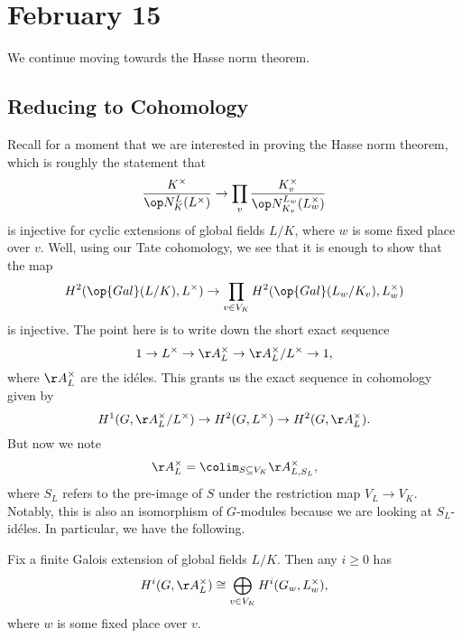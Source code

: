 \documentclass[../notes.tex]{subfiles}
\begin{document}
\section{February 15}
We continue moving towards the Hasse norm theorem.

\subsection{Reducing to Cohomology}
Recall for a moment that we are interested in proving the Hasse norm theorem, which is roughly the statement that
\[\frac{K^\times}{\op N^L_K(L^\times)}\to\prod_{v}\frac{K_v^\times}{\op N_{K_v}^{L_w}(L_w^\times)}\]
is injective for cyclic extensions of global fields $L/K$, where $w$ is some fixed place over $v$. Well, using our Tate cohomology, we see that it is enough to show that the map
\[H^2(\op{Gal}(L/K),L^\times)\to\prod_{v\in V_K}H^2(\op{Gal}(L_w/K_v),L_w^\times)\]
is injective. The point here is to write down the short exact sequence
\[1\to L^\times\to\AA_L^\times\to\AA_L^\times/L^\times\to1,\]
where $\AA_L^\times$ are the id\'eles. This grants us the exact sequence in cohomology given by
\[H^1(G,\AA_L^\times/L^\times)\to H^2(G,L^\times)\to H^2(G,\AA_L^\times).\]
But now we note
\[\AA_L^\times=\colim_{S\subseteq V_K}\AA_{L,S_L}^\times,\]
where $S_L$ refers to the pre-image of $S$ under the restriction map $V_L\to V_K$. Notably, this is also an isomorphism of $G$-modules because we are looking at $S_L$-id\'eles. In particular, we have the following.
\begin{proposition} \label{prop:global-to-local-idele}
	Fix a finite Galois extension of global fields $L/K$. Then any $i\ge0$ has
	\[H^i(G,\AA_L^\times)\cong\bigoplus_{v\in V_K}H^i(G_w,L_w^\times),\]
	where $w$ is some fixed place over $v$.
\end{proposition}
\end{document}

